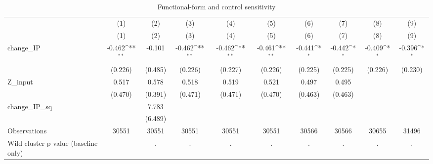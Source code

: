 \begin{table}[htbp]\centering
\def\sym#1{\ifmmode^{#1}\else\(^{#1}\)\fi}
\caption{Functional-form and control sensitivity}
\begin{tabular}{l*{9}{c}}
\hline\hline
            &\multicolumn{1}{c}{(1)}&\multicolumn{1}{c}{(2)}&\multicolumn{1}{c}{(3)}&\multicolumn{1}{c}{(4)}&\multicolumn{1}{c}{(5)}&\multicolumn{1}{c}{(6)}&\multicolumn{1}{c}{(7)}&\multicolumn{1}{c}{(8)}&\multicolumn{1}{c}{(9)}\\
            &\multicolumn{1}{c}{(1)}&\multicolumn{1}{c}{(2)}&\multicolumn{1}{c}{(3)}&\multicolumn{1}{c}{(4)}&\multicolumn{1}{c}{(5)}&\multicolumn{1}{c}{(6)}&\multicolumn{1}{c}{(7)}&\multicolumn{1}{c}{(8)}&\multicolumn{1}{c}{(9)}\\
\hline
change\_IP   &      -0.462\sym{**} &      -0.101         &      -0.462\sym{**} &      -0.462\sym{**} &      -0.461\sym{**} &      -0.441\sym{*}  &      -0.442\sym{*}  &      -0.409\sym{*}  &      -0.396\sym{*}  \\
            &     (0.226)         &     (0.485)         &     (0.226)         &     (0.227)         &     (0.226)         &     (0.225)         &     (0.225)         &     (0.226)         &     (0.230)         \\
[1em]
Z\_input     &       0.517         &       0.578         &       0.518         &       0.519         &       0.521         &       0.497         &       0.495         &                     &                     \\
            &     (0.470)         &     (0.391)         &     (0.471)         &     (0.471)         &     (0.470)         &     (0.463)         &     (0.463)         &                     &                     \\
[1em]
change\_IP\_sq&                     &       7.783         &                     &                     &                     &                     &                     &                     &                     \\
            &                     &     (6.489)         &                     &                     &                     &                     &                     &                     &                     \\
\hline
Observations&       30551         &       30551         &       30551         &       30551         &       30551         &       30566         &       30566         &       30655         &       31496         \\
Wild-cluster p-value (baseline only)&                     &           .         &           .         &           .         &           .         &           .         &           .         &           .         &           .         \\

\end{tabular}
\end{table}
